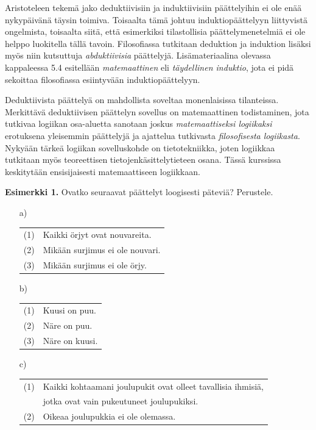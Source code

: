Aristoteleen tekemä jako deduktiivisiin ja induktiivisiin päättelyihin ei ole enää nykypäivänä täysin toimiva. Toisaalta tämä johtuu induktiopäättelyyn liittyvistä ongelmista, toisaalta siitä, että esimerkiksi tilastollisia päättelymenetelmiä ei ole helppo luokitella tällä tavoin. Filosofiassa tutkitaan deduktion ja induktion lisäksi myös niin kutsuttuja \emph{abduktiivisia} päättelyjä. Lisämateriaalina olevassa kappaleessa 5.4 esitellään \emph{matemaattinen} eli \emph{täydellinen induktio}, jota ei pidä sekoittaa filosofiassa esiintyvään induktiopäättelyyn.

Deduktiivista päättelyä on mahdollista soveltaa monenlaisissa tilanteissa. Merkittävä deduktiivisen päättelyn sovellus on matemaattinen todistaminen, jota tutkivaa logiikan osa-aluetta sanotaan joskus \emph{matemaattiseksi logiikaksi} erotuksena yleisemmin päättelyjä ja ajattelua tutkivasta \emph{filosofisesta logiikasta}. Nykyään tärkeä logiikan sovelluskohde on tietotekniikka, joten logiikkaa tutkitaan myös teoreettisen tietojen\-käsittely\-tieteen osana. Tässä kurssissa keskitytään ensisijaisesti matemaattiseen logiikkaan.

{\bf Esimerkki 1.} Ovatko seuraavat päättelyt loogisesti päteviä? Perustele.

\begin{itemize}
\item[a)] 

\begin{tabular}{ll}
(1) & Kaikki örjyt ovat nouvareita.\\ 
(2) & Mikään surjimus ei ole nouvari.\\ \hline
(3) & Mikään surjimus ei ole örjy.
\end{tabular}

\item[b)]

\begin{tabular}{ll}
(1) & Kuusi on puu.\\ 
(2) & Näre on puu.\\ \hline
(3) & Näre on kuusi.
\end{tabular}

\item[c)]

\begin{tabular}{ll}
(1) & Kaikki kohtaamani joulupukit ovat olleet tavallisia ihmisiä,\\
& jotka ovat vain pukeutuneet joulupukiksi.\\ \hline 
(2) & Oikeaa joulupukkia ei ole olemassa.\\ 
\end{tabular}

\end{itemize}

